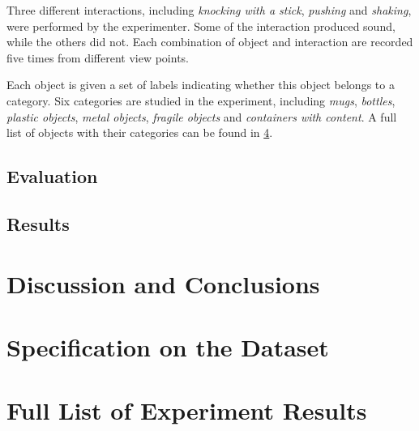 \documentclass[12pt,final,twoside]{report}
\theoremstyle{plain}
\theoremstyle{definition}
\theoremstyle{remark}
\begin{document}
Three different interactions, including \emph{knocking with a stick}, \emph{pushing} and \emph{shaking}, were performed by the experimenter. Some of the interaction produced sound, while the others did not. Each combination of object and interaction are recorded five times from different view points. 

Each object is given a set of labels indicating whether this object belongs to a category. Six categories are studied in the experiment, including \emph{mugs}, \emph{bottles}, \emph{plastic objects}, \emph{metal objects}, \emph{fragile objects} and \emph{containers with content}.  
A full list of objects with their categories can be found in \cref{app:dataset}. 

\section{Evaluation}

\section{Results}

\cleardoublepage
\chapter{Discussion and Conclusions}

\cleardoublepage
\appendix
\fancyhead[LO,RE]{}                      %

\chapter{Specification on the Dataset}
\label{app:dataset}

\cleardoublepage

\chapter{Full List of Experiment Results}
\label{app:results}

\cleardoublepage

\end{document}
